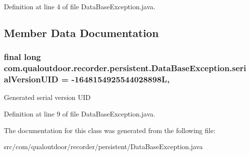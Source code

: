 Definition at line 4 of file Data\-Base\-Exception.\-java.



\subsection{Member Data Documentation}
\hypertarget{classcom_1_1qualoutdoor_1_1recorder_1_1persistent_1_1DataBaseException_ac46ea235d94fa0330db26414b56b3ed2}{
\subsubsection[{serial\-Version\-U\-I\-D}]{\setlength{\rightskip}{0pt plus 5cm}final long com.\-qualoutdoor.\-recorder.\-persistent.\-Data\-Base\-Exception.\-serial\-Version\-U\-I\-D = -\/1648154925544028898\-L\hspace{0.3cm}{\ttfamily [static]}, {\ttfamily [private]}}}\label{classcom_1_1qualoutdoor_1_1recorder_1_1persistent_1_1DataBaseException_ac46ea235d94fa0330db26414b56b3ed2}
Generated serial version U\-I\-D 

Definition at line 9 of file Data\-Base\-Exception.\-java.



The documentation for this class was generated from the following file\-:\begin{DoxyCompactItemize}
\item 
src/com/qualoutdoor/recorder/persistent/Data\-Base\-Exception.\-java\end{DoxyCompactItemize}
